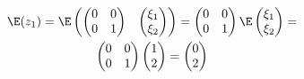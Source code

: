 \documentclass[pdftex,11pt,openany]{book}\usepackage[]{graphicx}\usepackage[]{color}
\begin{document}
\begin{solution}
\begin{multline}
\E (z_1) = \E   \begin{pmatrix}
 \begin{pmatrix}
0 & 0 \\
0 & 1 \\
\end{pmatrix}  &  \begin{pmatrix}
\xi_1 \\
\xi_2 \\
\end{pmatrix}  \\
\end{pmatrix}  =  \begin{pmatrix}
0 & 0 \\
0 & 1 \\
\end{pmatrix}  \E   \begin{pmatrix}
\xi_1 \\
\xi_2 \\
\end{pmatrix}  = \\
 \begin{pmatrix}
0 & 0 \\
0 & 1 \\
\end{pmatrix}   \begin{pmatrix}
1\\
2\\
\end{pmatrix}  =  \begin{pmatrix}
0\\
2\\
\end{pmatrix} 
\end{multline}


\end{solution}
\end{document}
